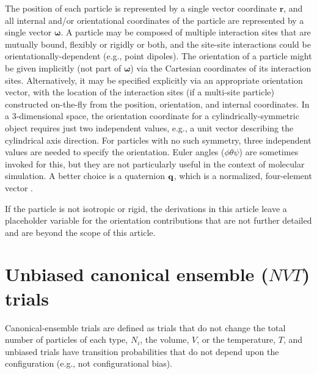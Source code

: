 \documentclass[
  9pt,
  bestpractices,
]{livecoms}
\begin{document}
The position of each particle is represented by a single vector coordinate $\mathbf{r}$, and all internal and/or orientational coordinates of the particle are represented by a single vector $\boldsymbol{\omega}$.
A particle may be composed of multiple interaction sites that are mutually bound, flexibly or rigidly or both, and the site-site interactions could be orientationally-dependent (e.g., point dipoles).
The orientation of a particle might be given implicitly (not part of $\boldsymbol{\omega}$) via the Cartesian coordinates of its interaction sites.
Alternatively, it may be specified explicitly via an appropriate orientation vector, with the location of the interaction sites (if a multi-site particle) constructed on-the-fly from the position, orientation, and internal coordinates.
In a 3-dimensional space, the orientation coordinate for a cylindrically-symmetric object requires just two independent values, e.g., a unit  vector describing the cylindrical axis direction.
For particles with no such symmetry, three independent values are needed to specify the orientation.
Euler angles ($\phi\theta\psi$) are sometimes invoked for this, but they are not particularly useful in the context of molecular simulation.
A better choice is a quaternion ${\bf q}$, which is a normalized, four-element vector \cite{vesely_angular_1982, karney_quaternions_2007}.

If the particle is not isotropic or rigid, the derivations in this article leave a placeholder variable for the orientation contributions that are not further detailed and are beyond the scope of this article.

\section{\label{sec:rhs_nvt}Unbiased canonical ensemble ($NVT$) trials}

Canonical-ensemble trials are defined as trials that do not change the total number of particles of each type, $N_i$, the volume, $V$, or the temperature, $T$, and unbiased trials have transition probabilities that do not depend upon the configuration (e.g., not configurational bias).
\end{document}
